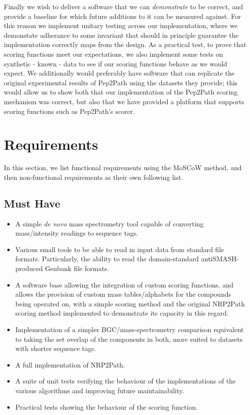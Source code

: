 \documentclass{l4proj}
\begin{document}
Finally we wish to deliver a software that we can \textit{demonstrate} to be correct, and provide a baseline for which future additions to it can be measured against. For this reason we implement unitary testing across our implementation, where we demonstate adherance to some invariant that should in principle guarantee the implementation correctly maps from the design. As a practical test, to prove that scoring functions meet our expectations, we also implement some tests on synthetic - known - data to see if our scoring functions behave as we would expect. We additionally would preferably have software that can replicate the original experimental results of Pep2Path using the datasets they provide; this would allow us to show both that our implementation of the Pep2Path scoring mechanism was correct, but also that we have provided a platform that supports scoring functions such as Pep2Path's scorer.

\section{Requirements} \label{moscow}

In this section, we list functional requirements using the MoSCoW method, and then non-functional requirements as their own following list.

\subsection{Must Have}

\begin{itemize}

\item A simple \textit{de novo} mass spectrometry tool capable of converting mass/intensity readings to sequence tags.
\item Various small tools to be able to read in input data from standard file formats. Particularly, the ability to read the domain-standard antiSMASH-produced Genbank file formats.
\item A software base allowing the integration of custom scoring functions, and allows the provision of custom mass tables/alphabets for the compounds being operated on, with a simple scoring method and the original NRP2Path scoring method implemented to demonstrate its capacity in this regard.
\item Implementation of a simpler BGC/mass-spectrometry comparison equivalent to taking the set overlap of the components in both, more suited to datasets with shorter sequence tags.
\item A full implementation of NRP2Path.
\item A suite of unit tests verifying the behaviour of the implementations of the various algorithms and improving future maintainability.
\item Practical tests showing the behaviour of the scoring function.
\end{itemize}
\end{document}
